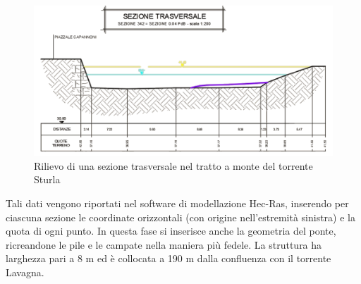 \documentclass[12pt]{article} %
\begin{document}
\begin{figure}[H]
    \centering
    \includegraphics[scale=0.5]{Sezione.png}
    \caption{Rilievo di una sezione trasversale nel tratto a monte del torrente Sturla}
    \label{fig:AutoCAD}
\end{figure}

\noindent Tali dati vengono riportati nel software di modellazione Hec-Ras, inserendo per ciascuna sezione le coordinate orizzontali (con origine nell'estremità sinistra) e la quota di ogni punto. 
In questa fase si inserisce anche la geometria del ponte, ricreandone le pile e le campate nella maniera più fedele. La struttura ha larghezza pari a 8 m ed è collocata a 190 m dalla confluenza con il torrente Lavagna.
\end{document}
